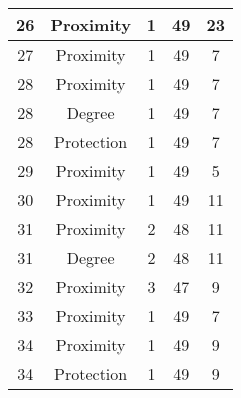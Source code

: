 \documentclass[results.tex]{subfiles}
\begin{document}
\begin{center}
\begin{tabular}{| c || c | c | c | c |}
            \hline
            26                      & Proximity                    & 1                      & 49                      & 23                   \\
            \hline
            27                      & Proximity                    & 1                      & 49                      & 7                    \\
            \hline
            28                      & Proximity                    & 1                      & 49                      & 7                    \\
            \hline
            28                      & Degree                       & 1                      & 49                      & 7                    \\
            \hline
            28                      & Protection                   & 1                      & 49                      & 7                    \\
            \hline
            29                      & Proximity                    & 1                      & 49                      & 5                    \\
            \hline
            30                      & Proximity                    & 1                      & 49                      & 11                   \\
            \hline
            31                      & Proximity                    & 2                      & 48                      & 11                   \\
            \hline
            31                      & Degree                       & 2                      & 48                      & 11                   \\
            \hline
            32                      & Proximity                    & 3                      & 47                      & 9                    \\
            \hline
            33                      & Proximity                    & 1                      & 49                      & 7                    \\
            \hline
            34                      & Proximity                    & 1                      & 49                      & 9                    \\
            \hline
            34                      & Protection                   & 1                      & 49                      & 9                    \\

\end{tabular}
\end{center}
\end{document}
